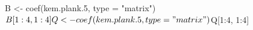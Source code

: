 \begin{Schunk}
\begin{Sinput}
 B <- coef(kem.plank.5, type = "matrix")$B[1:4, 1:4]
 Q <- coef(kem.plank.5, type = "matrix")$Q[1:4, 1:4]
\end{Sinput}
\end{Schunk}
